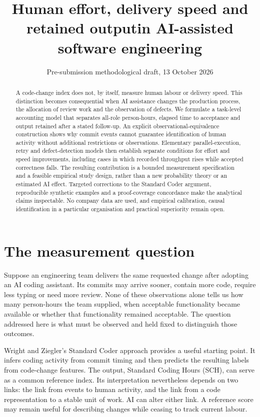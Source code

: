 \documentclass[11pt,a4paper]{amsart}
\title[Effort, speed and retained output]{Human effort, delivery speed and retained output\newline in AI-assisted software engineering}
\date{Pre-submission methodological draft, 13 October 2026}
\theoremstyle{definition}
\theoremstyle{remark}
\begin{document}
\begin{abstract}
A code-change index does not, by itself, measure human labour or delivery speed. This distinction becomes consequential when AI assistance changes the production process, the allocation of review work and the observation of defects. We formulate a task-level accounting model that separates all-role person-hours, elapsed time to acceptance and output retained after a stated follow-up. An explicit observational-equivalence construction shows why commit events cannot guarantee identification of human activity without additional restrictions or observations. Elementary parallel-execution, retry and defect-detection models then establish separate conditions for effort and speed improvements, including cases in which recorded throughput rises while accepted correctness falls. The resulting contribution is a bounded measurement specification and a feasible empirical study design, rather than a new probability theory or an estimated AI effect. Targeted corrections to the Standard Coder argument, reproducible synthetic examples and a proof-coverage concordance make the analytical claims inspectable. No company data are used, and empirical calibration, causal identification in a particular organisation and practical superiority remain open.
\end{abstract}
\maketitle

\section{The measurement question}
\label{sec:introduction}

Suppose an engineering team delivers the same requested change after adopting an AI coding assistant. Its commits may arrive sooner, contain more code, require less typing or need more review. None of these observations alone tells us how many person-hours the team supplied, when acceptable functionality became available or whether that functionality remained acceptable. The question addressed here is what must be observed and held fixed to distinguish those outcomes.

Wright and Ziegler's Standard Coder approach \cite{wright2019} provides a useful starting point. It infers coding activity from commit timing and then predicts the resulting labels from code-change features. The output, Standard Coding Hours (SCH), can serve as a common reference index. Its interpretation nevertheless depends on two links: the link from events to human activity, and the link from a code representation to a stable unit of work. AI can alter either link. A reference score may remain useful for describing changes while ceasing to track current labour.
\end{document}
